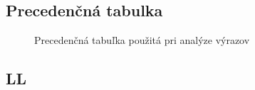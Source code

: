 \documentclass[a4paper, 11pt]{article}
\begin{document}
	\subsection{Precedenčná tabulka}
    \begin{figure}[h]
		\centering
		\caption{Precedenčná tabuľka použitá pri analýze výrazov}
	\end{figure}

    \pagebreak
    
    \subsection{LL}
\end{document}

